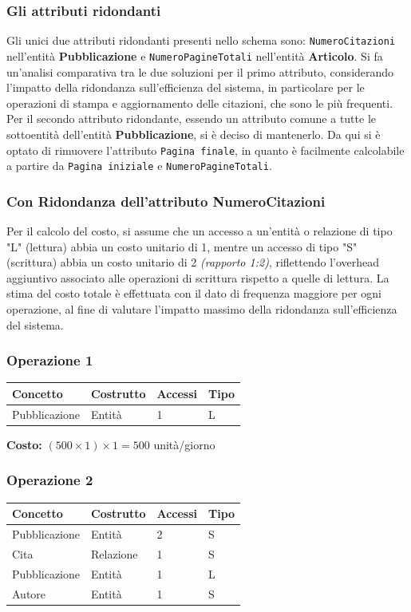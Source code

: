 \documentclass[a4paper,12pt]{article}
\begin{document}
\subsubsection{Gli attributi ridondanti}
Gli unici due attributi ridondanti presenti nello schema sono: \texttt{NumeroCitazioni} nell'entità \textbf{Pubblicazione} e \texttt{NumeroPagineTotali} nell'entità \textbf{Articolo}. Si fa un'analisi comparativa tra le due soluzioni per il primo attributo, considerando l'impatto della ridondanza sull'efficienza del sistema, in particolare per le operazioni di stampa e aggiornamento delle citazioni, che sono le più frequenti.
Per il secondo attributo ridondante, essendo un attributo comune a tutte le sottoentità dell'entità \textbf{Pubblicazione}, si è deciso di mantenerlo. Da qui si è optato di rimuovere l'attributo \texttt{Pagina finale}, in quanto è facilmente calcolabile a partire da \texttt{Pagina iniziale} e \texttt{NumeroPagineTotali}. 
\subsubsection{Con Ridondanza dell'attributo NumeroCitazioni} 
Per il calcolo del costo, si assume che un accesso a un'entità o relazione di tipo "L" (lettura) abbia un costo unitario di 1, mentre un accesso di tipo "S" (scrittura) abbia un costo unitario di 2 \textit{(rapporto 1:2)}, riflettendo l'overhead aggiuntivo associato alle operazioni di scrittura rispetto a quelle di lettura. 
La stima del costo totale è effettuata con il dato di frequenza maggiore per ogni operazione, al fine di valutare l'impatto massimo della ridondanza sull'efficienza del sistema.
\subsubsection*{Operazione 1}
\begin{tabular}{llll}
\toprule
\textbf{Concetto} & \textbf{Costrutto} & \textbf{Accessi} & \textbf{Tipo} \\
\midrule
Pubblicazione & Entità & 1 & L \\
\bottomrule
\end{tabular}

\medskip
\textbf{Costo:} $(500 \times 1) \times 1 = 500$ unità/giorno

\subsubsection*{Operazione 2}
\begin{tabular}{llll}
\toprule
\textbf{Concetto} & \textbf{Costrutto} & \textbf{Accessi} & \textbf{Tipo} \\
\midrule
Pubblicazione & Entità & 2 & S \\
Cita          & Relazione & 1 & S \\
Pubblicazione & Entità & 1 & L \\
Autore        & Entità & 1 & S \\
\bottomrule
\end{tabular}
\end{document}
